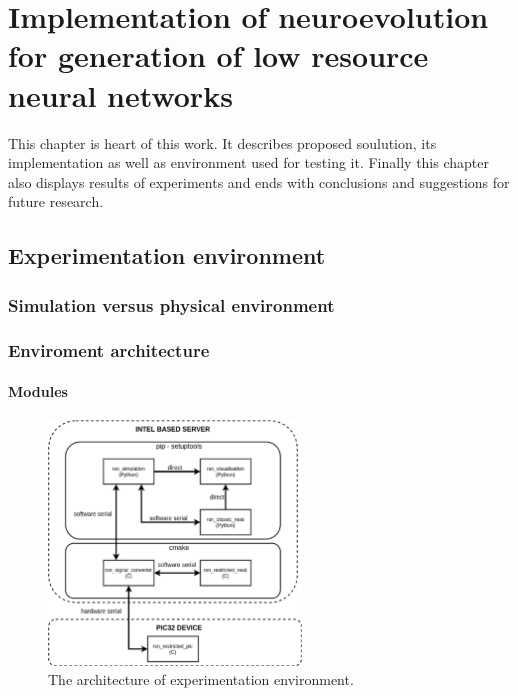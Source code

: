 \FloatBarrier
\chapter{Implementation of neuroevolution for generation of low resource neural networks}
This chapter is heart of this work. It describes proposed soulution, its implementation as 
well as environment used for testing it. Finally this chapter also displays results of 
experiments and ends with conclusions and suggestions for future research.

\FloatBarrier
\section{Experimentation environment}

\FloatBarrier
\subsection{Simulation versus physical environment}

\FloatBarrier
\subsection{Enviroment architecture}

\subsubsection{Modules}
\begin{figure}[htb] 
	\centering
	\includegraphics[width=0.6\textwidth]{figures/experiment_arch}
	\caption{The architecture of experimentation environment.}
	\label{fig:experiment_arch}
\end{figure}

